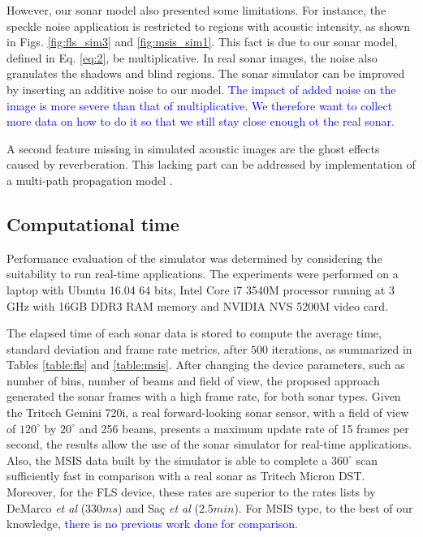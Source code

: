\documentclass[final,5p,times]{elsarticle}
\begin{document}
However, our
sonar model also presented some limitations. For instance, the speckle noise
application is restricted to regions with acoustic intensity, as shown in
Figs. \ref{fig:fls_sim3} and \ref{fig:msis_sim1}. This fact is due to our
sonar model, defined in Eq. \ref{eq:2}, be multiplicative. In real sonar
images, the noise also granulates the shadows and blind regions. The sonar
simulator can be improved by inserting an additive noise to our model.
\textcolor{blue}{The impact of added noise on the image is more severe
than that of multiplicative. We therefore want to collect more data on how to do
it so that we still stay close enough ot the real sonar.}

A second feature missing in simulated acoustic images are the ghost effects
caused by reverberation. This lacking part can be addressed by implementation
of a multi-path propagation model \textcolor{blue}{\cite{huang2015b}}.

\subsection{Computational time}

Performance evaluation of the simulator was determined by considering the
suitability to run real-time applications. The experiments were performed
on a laptop with Ubuntu 16.04 64 bits, Intel Core i7 3540M processor
running at 3 GHz with 16GB DDR3 RAM memory and NVIDIA NVS 5200M video card.

The elapsed time of each sonar data is stored to compute the average time,
standard deviation and frame rate metrics, after $500$ iterations, as
summarized in Tables \ref{table:fls} and \ref{table:msis}. After changing
the device parameters, such as number of bins, number of beams and field
of view, the proposed approach generated the sonar frames with a high
frame rate, for both sonar types. Given the Tritech Gemini 720i, a real
forward-looking sonar sensor, with a field of view of $120^{\circ}$ by
$20^{\circ}$ and 256 beams, presents a maximum update rate of 15 frames
per second, the results allow the use of the sonar simulator for real-time
applications. Also, the MSIS data built by the simulator is able to
complete a $360^{\circ}$ scan sufficiently fast in comparison with a
real sonar as Tritech Micron DST. Moreover, for the FLS device, these
rates are superior to the rates lists by DeMarco \textit{et al}
\cite{demarco2015} ($330 ms$) and Saç \textit{et al} \cite{sac2015}
($2.5 min$). For MSIS type, to the best of our knowledge, \textcolor{blue}{there is no
previous work done for comparison.}
\end{document}
